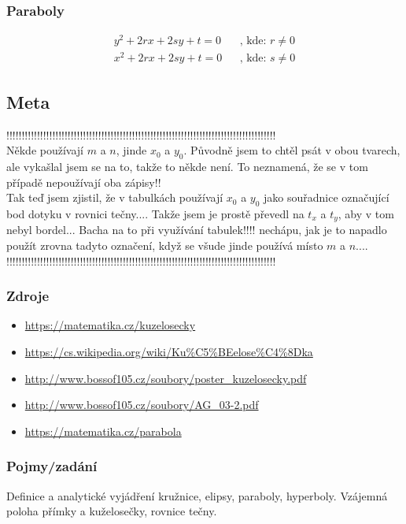\documentclass[12pt]{article}
\begin{document}
\subsubsection{Paraboly}
\begin{align}
y^2 +2rx+2sy +t =0 && \text{, kde: } r \neq 0 \\
x^2 +2rx+2sy +t =0 && \text{, kde: } s \neq 0
\end{align}
\subsection{Meta}
\label{sec:kuz_meta}
!!!!!!!!!!!!!!!!!!!!!!!!!!!!!!!!!!!!!!!!!!!!!!!!!!!!!!!!!!!!!!!!!!!!!!!!!!!!!!!!!!!!!!!!\\
Někde používají $m$ a $n$, jinde $x_0$ a $y_0$. Původně jsem to chtěl psát v obou tvarech, ale vykašlal jsem se na to, takže to někde není. To neznamená, že se v tom případě nepoužívají oba zápisy!!\\
Tak teď jsem zjistil, že v tabulkách používají $x_0$ a $y_0$ jako souřadnice označující bod dotyku v rovnici tečny.... Takže jsem je prostě převedl na $t_x$ a $t_y$, aby v tom nebyl bordel... Bacha na to při využívání tabulek!!!! nechápu, jak je to napadlo použít zrovna tadyto označení, když se všude jinde používá místo $m$ a $n$.... \\
!!!!!!!!!!!!!!!!!!!!!!!!!!!!!!!!!!!!!!!!!!!!!!!!!!!!!!!!!!!!!!!!!!!!!!!!!!!!!!!!!!!!!!!!\\
\subsubsection{Zdroje}
\begin{itemize}
\item \url{https://matematika.cz/kuzelosecky}
\item \url{https://cs.wikipedia.org/wiki/Ku\%C5\%BEelose\%C4\%8Dka}
\item \url{http://www.bossof105.cz/soubory/poster_kuzelosecky.pdf}
\item \url{http://www.bossof105.cz/soubory/AG_03-2.pdf}
\item \url{https://matematika.cz/parabola}
\end{itemize}
\subsubsection{Pojmy/zadání}
Definice a analytické vyjádření kružnice, elipsy, paraboly, hyperboly. Vzájemná poloha přímky a kuželosečky, rovnice tečny.
\end{document}

